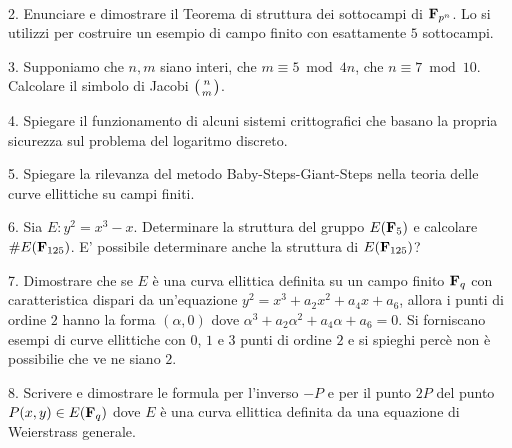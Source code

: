 \ \dotfill\ \bigskip\bigskip\bigskip


\vfil\eject


\item{2.} Enunciare e dimostrare il Teorema di struttura dei sottocampi di ${\bf F}_{p^n}$. Lo si utilizzi per costruire
un esempio di campo finito con esattamente $5$ sottocampi. \vv


\item{3.} Supponiamo che $n,m$ siano interi, che $m\equiv 5\bmod 4n$, che $n\equiv7\bmod10$. Calcolare il simbolo di
Jacobi $\left({n\atop m}\right)$.\ve\ \vs



\item{4.} Spiegare il funzionamento di alcuni sistemi crittografici che basano la propria sicurezza sul problema del 
logaritmo discreto.\vv


\item{5.} Spiegare la rilevanza del metodo Baby-Steps-Giant-Steps nella teoria delle curve ellittiche su campi finiti.
\ve\ \vs

\item{6.} Sia $E: y^2=x^3-x$. Determinare la struttura del gruppo $E({\bf F}_5)$  e calcolare $\#E({\bf F}_{125})$. E' possibile
determinare anche la struttura di $E({\bf F}_{125})$?\vskip8cm

\item{7.} Dimostrare che se $E$ \`e una curva ellittica definita su un campo finito ${\bf F}_q$
con caratteristica dispari da un'equazione $y^2=x^3+a_2x^2+a_4x+a_6$, allora i punti di ordine $2$ hanno la forma $(\alpha,0)$
dove $\alpha^3+a_2\alpha^2+a_4\alpha+a_6=0$. Si forniscano esempi di curve ellittiche con $0$, $1$ e $3$ punti di ordine $2$ e
si spieghi perc\`e non \`e possibilie che ve ne siano $2$.\vskip8cm


%

\item{8.} Scrivere e dimostrare le formula per l'inverso $-P$ e per il punto $2P$ del punto $P(x,y)\in E({\bf F}_q)$ dove
$E$ \`e una curva ellittica definita da una equazione di Weierstrass generale.

\ \vst
 \bye
